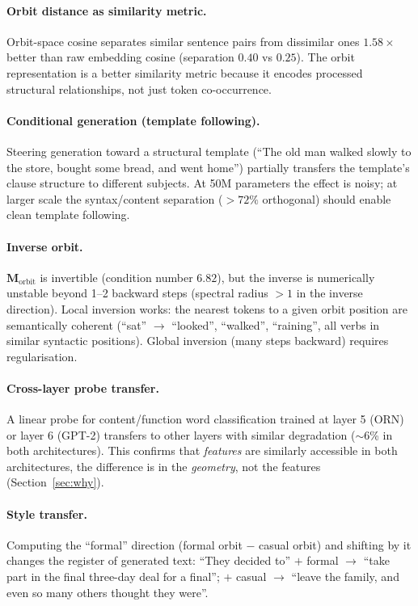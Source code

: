\documentclass[11pt, a4paper]{article}
\newcommand{\M}{\mathbf{M}}
\theoremstyle{plain}
\theoremstyle{definition}
\theoremstyle{remark}
\begin{document}
\paragraph{Orbit distance as similarity metric.}
Orbit-space cosine separates similar sentence pairs from dissimilar ones $1.58\times$ better than raw embedding cosine (separation $0.40$ vs $0.25$).
The orbit representation is a better similarity metric because it encodes processed structural relationships, not just token co-occurrence.

\paragraph{Conditional generation (template following).}
Steering generation toward a structural template (``The old man walked slowly to the store, bought some bread, and went home'') partially transfers the template's clause structure to different subjects.
At 50M parameters the effect is noisy; at larger scale the syntax/content separation ($>72\%$ orthogonal) should enable clean template following.

\paragraph{Inverse orbit.}
$\M_{\text{orbit}}$ is invertible (condition number $6.82$), but the inverse is numerically unstable beyond 1--2 backward steps (spectral radius $> 1$ in the inverse direction).
Local inversion works: the nearest tokens to a given orbit position are semantically coherent (``sat'' $\to$ ``looked'', ``walked'', ``raining'', all verbs in similar syntactic positions).
Global inversion (many steps backward) requires regularisation.

\paragraph{Cross-layer probe transfer.}
A linear probe for content/function word classification trained at layer 5 (ORN) or layer 6 (GPT-2) transfers to other layers with similar degradation ($\sim$6\% in both architectures).
This confirms that \emph{features} are similarly accessible in both architectures, the difference is in the \emph{geometry}, not the features (Section~\ref{sec:why}).

\paragraph{Style transfer.}
Computing the ``formal'' direction (formal orbit $-$ casual orbit) and shifting by it changes the register of generated text:
``They decided to'' $+$ formal $\to$ ``take part in the final three-day deal for a final'';
$+$ casual $\to$ ``leave the family, and even so many others thought they were''.
\end{document}
